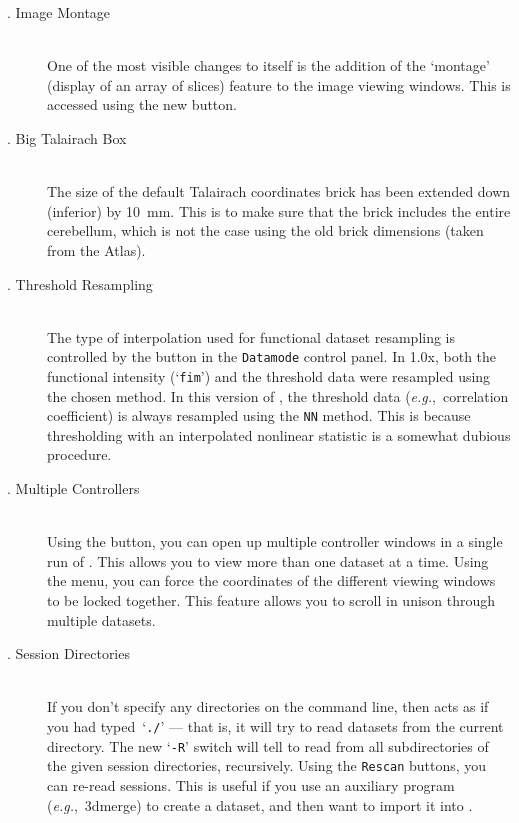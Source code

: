 \begin{description}
  \item[. Image Montage] \blob\\
    One of the most visible changes to \afnit itself is the addition of
    the `montage' (display of an array of slices)
    feature to the image viewing windows.
    This is accessed using the new  button.

   \item[. Big Talairach Box]\blob\\
   The size of the default Talairach coordinates brick has been extended down
   (inferior) by 10~mm.  This is to make sure that the brick includes the entire
   cerebellum, which is not the case using the old brick dimensions (taken
   from the Atlas).

   \item[. Threshold Resampling]\blob\\
   The type of interpolation used for functional dataset resampling is controlled by
   the  button in the {\tt Datamode} control panel.
   In \afnit 1.0x, both the functional intensity (`{\tt fim}') and the threshold
   data were resampled using the chosen method.  In this version of \afni,
   the threshold data ({\it e.g.},~correlation coefficient) is always
   resampled using the {\tt NN} method.  This is because thresholding with
   an interpolated nonlinear statistic is a somewhat dubious procedure.

   \item[. Multiple \afnit Controllers]\blob\\
   Using the  button, you can open up multiple controller windows
   in a single run of \afni.  This allows you to view more than one dataset
   at a time.  Using the  menu, you can force the coordinates
   of the different viewing windows to be locked together.  This feature
   allows you to scroll in unison through multiple datasets.

\goodbreak

    \item[. Session Directories]\blob\\
     If you don't specify any directories on the command line,
     then \afnit acts as if you had typed~`{\tt ./}' --- that is,
     it will try to read datasets from the current directory.
     The new `{\tt -R}' switch will tell \afnit to read from
     all subdirectories of the given session directories, recursively.
     Using the {\tt Rescan} buttons, you can re-read sessions.
     This is useful if you use an auxiliary program ({\it e.g.},~{\sf 3dmerge})
     to create a dataset, and then want to import it into \afni.


\end{description}
